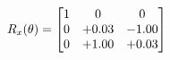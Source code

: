 \documentclass[preview]{standalone}
\begin{document}
\begin{align*}
\special{dvisvgm:raw <g id='unique000'>}R_{x}(\theta) = \begin{bmatrix}1 & 0 & 0 \\0 & +0.03 & -1.00 \\0 & +1.00 & +0.03\end{bmatrix}\special{dvisvgm:raw </g>}
\end{align*}
\end{document}
